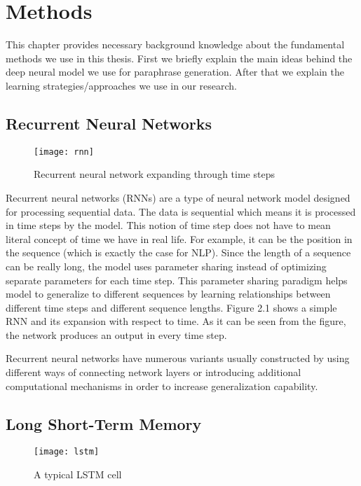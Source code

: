 \chapter{Methods}\label{methods}

This chapter provides necessary background knowledge about the fundamental methods we use in this thesis. First we briefly explain the main ideas behind the deep neural model we use for paraphrase generation. After that we explain the learning strategies/approaches we use in our research.

\section{Recurrent Neural Networks}

\begin{figure}[t]
\texttt{[image: rnn]}
\centering
\caption{Recurrent neural network expanding through time steps \cite{zhao}}
\end{figure}

Recurrent neural networks (RNNs) are a type of neural network model designed for processing sequential data. The data is sequential which means it is processed in time steps by the model. This notion of time step does not have to mean literal concept of time we have in real life. For example, it can be the position in the sequence (which is exactly the case for NLP). Since the length of a sequence can be really long, the model uses parameter sharing instead of optimizing separate parameters for each time step. This parameter sharing paradigm helps model to generalize to different sequences by learning relationships between different time steps and different sequence lengths. Figure 2.1 shows a simple RNN and its expansion with respect to time. As it can be seen from the figure, the network produces an output in every time step.

Recurrent neural networks have numerous variants usually constructed by using different ways of connecting network layers or introducing additional computational mechanisms in order to increase generalization capability. 

\section{Long Short-Term Memory}

\begin{figure}[t]
\texttt{[image: lstm]}
\centering
\caption{A typical LSTM cell \cite{paszke}}
\end{figure}

